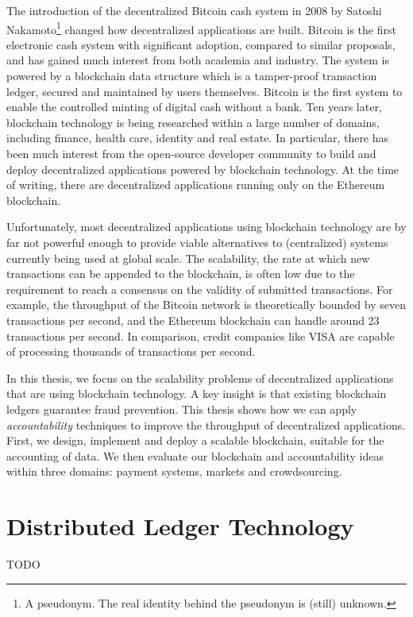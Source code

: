 The introduction of the decentralized Bitcoin cash system in 2008 by Satoshi Nakamoto\footnote{A pseudonym. The real identity behind the pseudonym is (still) unknown.} changed how decentralized applications are built.
Bitcoin is the first electronic cash system with significant adoption, compared to similar proposals, and has gained much interest from both academia and industry.
The system is powered by a blockchain data structure which is a tamper-proof transaction ledger, secured and maintained by users themselves.
Bitcoin is the first system to enable the controlled minting of digital cash without a bank.
Ten years later, blockchain technology is being researched within a large number of domains, including finance, health care, identity and real estate.
In particular, there has been much interest from the open-source developer community to build and deploy decentralized applications powered by blockchain technology.
At the time of writing, there are  decentralized applications running only on the Ethereum blockchain.

Unfortunately, most decentralized applications using blockchain technology are by far not powerful enough to provide viable alternatives to (centralized) systems currently being used at global scale.
The scalability, the rate at which new transactions can be appended to the blockchain, is often low due to the requirement to reach a consensus on the validity of submitted transactions.
For example, the throughput of the Bitcoin network is theoretically bounded by seven transactions per second, and the Ethereum blockchain can handle around 23 transactions per second.
In comparison, credit companies like VISA are capable of processing thousands of transactions per second.


In this thesis, we focus on the scalability problems of decentralized applications that are using blockchain technology.
A key insight is that existing blockchain ledgers guarantee fraud prevention.
This thesis shows how we can apply \emph{accountability} techniques to improve the throughput of decentralized applications.
First, we design, implement and deploy a scalable blockchain, suitable for the accounting of data.
We then evaluate our blockchain and accountability ideas within three domains: payment systems, markets and crowdsourcing.

\section{Distributed Ledger Technology}
TODO

